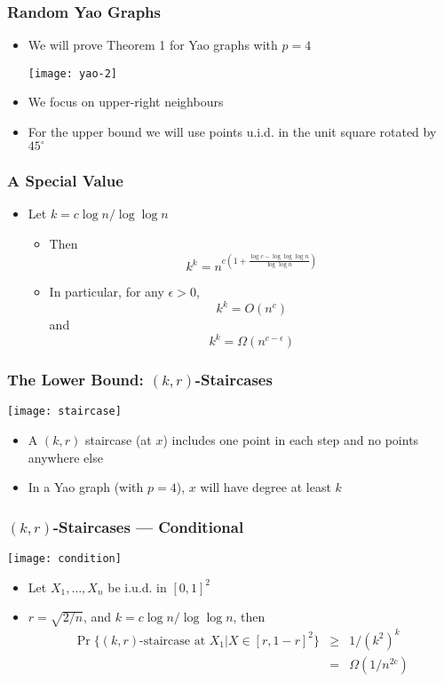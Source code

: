 \documentclass{beamer}
\begin{document}
\frame
{
  \frametitle{Random Yao Graphs}
  \begin{itemize}
    \item We will prove Theorem 1 for Yao graphs with $p=4$
    \begin{center}
      \texttt{[image: yao-2]}
    \end{center}
    \item We focus on upper-right neighbours
    \item For the upper bound we will use points u.i.d. in the unit 
          square rotated by $45^\circ$
  \end{itemize}
}


\frame
{
  \frametitle{A Special Value}
  \begin{itemize}
    \item Let $k=c\log n / \log\log n$
      \begin{itemize}
        \item Then
         \[ k^k = n^{c(1 + \frac{\log c-\log\log\log n}{\log\log n})} \]
        \item In particular, for any $\epsilon > 0$,
         \[ k^k = O(n^c) \]
         and 
         \[ k^k = \Omega(n^{c-\epsilon}) \]
      \end{itemize}
  \end{itemize}
}

\frame
{
  \frametitle{The Lower Bound: $(k,r)$-Staircases}

  \begin{center}
    \texttt{[image: staircase]}
  \end{center}
  \begin{itemize}
    \item A $(k,r)$ staircase (at $x$) includes one point in each step
          and no points anywhere else
    \item In a Yao graph (with $p=4$), $x$ will have degree at least $k$
  \end{itemize}
}


\frame
{
  \frametitle{$(k,r)$-Staircases --- Conditional}

  \begin{center}
      \texttt{[image: condition]} 
  \end{center}
  \begin{itemize}
    \item Let $X_1,\ldots,X_n$ be i.u.d. in $[0,1]^2$
    \item $r=\sqrt{2/n}$, and $k=c\log n/\log\log n$, then
    \begin{eqnarray*}
     \Pr\{\mbox{$(k,r)$-staircase at $X_1$}| X\in[r,1-r]^2\} 
         & \ge & 1/(k^2)^k \\
         & = & \Omega(1/n^{2c}) 
    \end{eqnarray*}
  \end{itemize}
}
\end{document}
